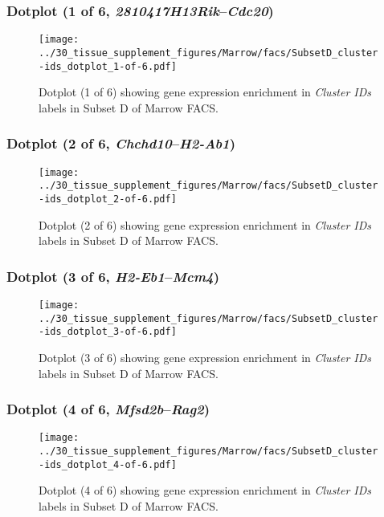 \clearpage

\subsubsection{Dotplot (1 of 6, \emph{2810417H13Rik}--\emph{Cdc20})}
\begin{figure}[h]
\centering
\texttt{[image: ../30\_tissue\_supplement\_figures/Marrow/facs/SubsetD\_cluster-ids\_dotplot\_1-of-6.pdf]}

\caption{ Dotplot (1 of 6)  showing gene expression enrichment in \emph{Cluster IDs} labels in Subset D of Marrow FACS. }
\end{figure}


\clearpage

\subsubsection{Dotplot (2 of 6, \emph{Chchd10}--\emph{H2-Ab1})}
\begin{figure}[h]
\centering
\texttt{[image: ../30\_tissue\_supplement\_figures/Marrow/facs/SubsetD\_cluster-ids\_dotplot\_2-of-6.pdf]}

\caption{ Dotplot (2 of 6)  showing gene expression enrichment in \emph{Cluster IDs} labels in Subset D of Marrow FACS. }
\end{figure}


\clearpage

\subsubsection{Dotplot (3 of 6, \emph{H2-Eb1}--\emph{Mcm4})}
\begin{figure}[h]
\centering
\texttt{[image: ../30\_tissue\_supplement\_figures/Marrow/facs/SubsetD\_cluster-ids\_dotplot\_3-of-6.pdf]}

\caption{ Dotplot (3 of 6)  showing gene expression enrichment in \emph{Cluster IDs} labels in Subset D of Marrow FACS. }
\end{figure}


\clearpage

\subsubsection{Dotplot (4 of 6, \emph{Mfsd2b}--\emph{Rag2})}
\begin{figure}[h]
\centering
\texttt{[image: ../30\_tissue\_supplement\_figures/Marrow/facs/SubsetD\_cluster-ids\_dotplot\_4-of-6.pdf]}

\caption{ Dotplot (4 of 6)  showing gene expression enrichment in \emph{Cluster IDs} labels in Subset D of Marrow FACS. }
\end{figure}



